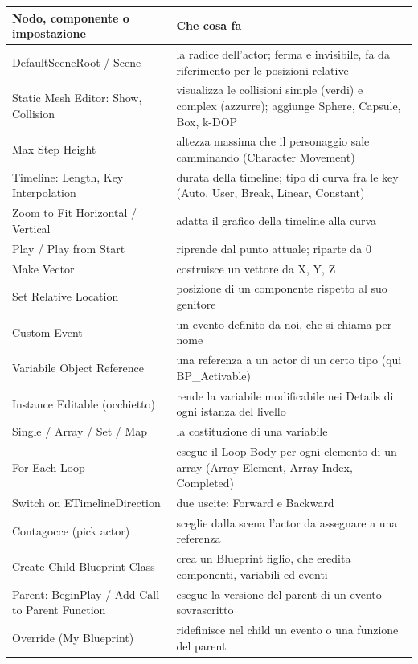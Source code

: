 \begin{table}[htbp]
\centering
\small
\begin{tabular}{@{}p{4.4cm}p{9.6cm}@{}}
\toprule
\textbf{Nodo, componente o impostazione} & \textbf{Che cosa fa} \\
\midrule
DefaultSceneRoot / Scene & la radice dell'actor; ferma e invisibile, fa da riferimento
per le posizioni relative \\
Static Mesh Editor: Show, Collision & visualizza le collisioni simple (verdi) e complex
(azzurre); aggiunge Sphere, Capsule, Box, k-DOP \\
Max Step Height & altezza massima che il personaggio sale camminando (Character
Movement) \\
Timeline: Length, Key Interpolation & durata della timeline; tipo di curva fra le key
(Auto, User, Break, Linear, Constant) \\
Zoom to Fit Horizontal / Vertical & adatta il grafico della timeline alla curva \\
Play / Play from Start & riprende dal punto attuale; riparte da 0 \\
Make Vector & costruisce un vettore da X, Y, Z \\
Set Relative Location & posizione di un componente rispetto al suo genitore \\
Custom Event & un evento definito da noi, che si chiama per nome \\
Variabile Object Reference & una referenza a un actor di un certo tipo (qui
BP\_Activable) \\
Instance Editable (occhietto) & rende la variabile modificabile nei Details di ogni
istanza del livello \\
Single / Array / Set / Map & la costituzione di una variabile \\
For Each Loop & esegue il Loop Body per ogni elemento di un array (Array Element, Array
Index, Completed) \\
Switch on ETimelineDirection & due uscite: Forward e Backward \\
Contagocce (pick actor) & sceglie dalla scena l'actor da assegnare a una referenza \\
Create Child Blueprint Class & crea un Blueprint figlio, che eredita componenti,
variabili ed eventi \\
Parent: BeginPlay / Add Call to Parent Function & esegue la versione del parent di un
evento sovrascritto \\
Override (My Blueprint) & ridefinisce nel child un evento o una funzione del parent \\

\end{tabular}
\end{table}
